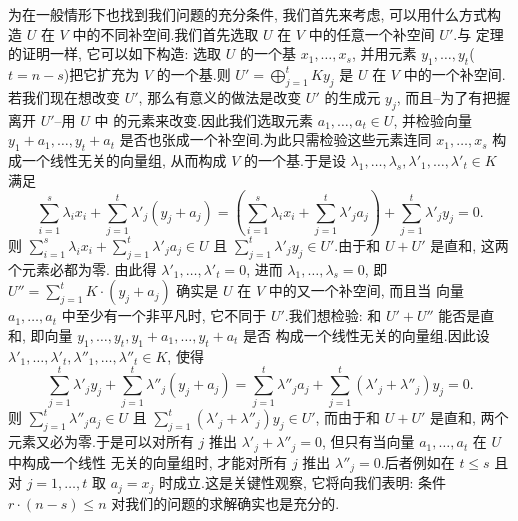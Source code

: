 为在一般情形下也找到我们问题的充分条件, 我们首先来考虑, 可以用什么方式构造 $U$ 在
$V$ 中的不同补空间.我们首先选取 $U$ 在 $V$ 中的任意一个补空间 $U'$.与
定理~ 的证明一样, 它可以如下构造: 选取 $U$ 的一个基 $x_1, \ldots, x_s$,
并用元素 $y_1, \ldots, y_t$($t = n - s$)把它扩充为 $V$ 的一个基.则
$U' = \bigoplus_{j=1}^{t} K y_j$ 是 $U$ 在 $V$ 中的一个补空间.若我们现在想改变 $U'$,
那么有意义的做法是改变 $U'$ 的生成元 $y_j$, 而且--为了有把握离开 $U'$--用 $U$ 中
的元素来改变.因此我们选取元素 $a_1, \ldots, a_t \in U$, 并检验向量
$y_1 + a_1, \ldots, y_t + a_t$ 是否也张成一个补空间.为此只需检验这些元素连同
$x_1, \ldots, x_s$ 构成一个线性无关的向量组, 从而构成 $V$ 的一个基.于是设
$\lambda_1, \ldots, \lambda_s, \lambda'_1, \ldots, \lambda'_t \in K$ 满足
\[
\sum_{i=1}^{s} \lambda_i x_i + \sum_{j=1}^{t} \lambda'_j (y_j + a_j) = \left( \sum_{i=1}^{s} \lambda_i x_i + \sum_{j=1}^{t} \lambda'_j a_j \right) + \sum_{j=1}^{t} \lambda'_j y_j = 0\text{.}
\]
则 $\sum_{i=1}^{s} \lambda_i x_i + \sum_{j=1}^{t} \lambda'_j a_j \in U$ 且
$\sum_{j=1}^{t} \lambda'_j y_j \in U'$.由于和 $U + U'$ 是直和, 这两个元素必都为零.
由此得 $\lambda'_1, \ldots, \lambda'_t = 0$, 进而 $\lambda_1, \ldots, \lambda_s = 0$, 即
$U'' = \sum_{j=1}^{t} K \cdot (y_j + a_j)$ 确实是 $U$ 在 $V$ 中的又一个补空间, 而且当
向量 $a_1, \ldots, a_t$ 中至少有一个非平凡时, 它不同于 $U'$.我们想检验: 和
$U' + U''$ 能否是直和, 即向量 $y_1, \ldots, y_t, y_1 + a_1, \ldots, y_t + a_t$ 是否
构成一个线性无关的向量组.因此设 $\lambda'_1, \ldots, \lambda'_t, \lambda''_1, \ldots,
\lambda''_t \in K$, 使得
\[
\sum_{j=1}^{t} \lambda'_j y_j + \sum_{j=1}^{t} \lambda''_j (y_j + a_j) = \sum_{j=1}^{t} \lambda''_j a_j + \sum_{j=1}^{t} (\lambda'_j + \lambda''_j) y_j = 0\text{.}
\]
则 $\sum_{j=1}^{t} \lambda''_j a_j \in U$ 且 $\sum_{j=1}^{t} (\lambda'_j + \lambda''_j) y_j
\in U'$, 而由于和 $U + U'$ 是直和, 两个元素又必为零.于是可以对所有 $j$ 推出
$\lambda'_j + \lambda''_j = 0$, 但只有当向量 $a_1, \ldots, a_t$ 在 $U$ 中构成一个线性
无关的向量组时, 才能对所有 $j$ 推出 $\lambda''_j = 0$.后者例如在 $t \leq s$ 且对
$j = 1, \ldots, t$ 取 $a_j = x_j$ 时成立.这是关键性观察, 它将向我们表明: 条件
$r \cdot (n - s) \leq n$ 对我们的问题的求解确实也是充分的.

